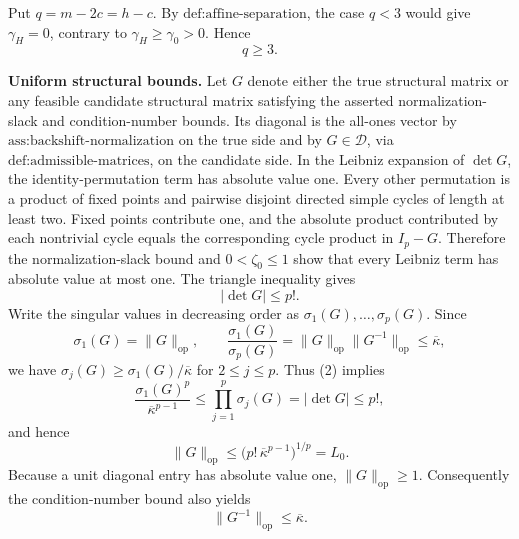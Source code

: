 Put \(q=m-2c=h-c\). By \(\text{def:affine-separation}\), the case \(q<3\) would give \(\gamma_H=0\), contrary to \(\gamma_H\geq\gamma_0>0\). Hence
\[
q\geq3.
\tag{1}
\]

\textbf{Uniform structural bounds.}
Let \(G\) denote either the true structural matrix or any feasible candidate structural matrix satisfying the asserted normalization-slack and condition-number bounds. Its diagonal is the all-ones vector by \(\text{ass:backshift-normalization}\) on the true side and by \(G\in\mathcal D\), via \(\text{def:admissible-matrices}\), on the candidate side. In the Leibniz expansion of \(\det G\), the identity-permutation term has absolute value one. Every other permutation is a product of fixed points and pairwise disjoint directed simple cycles of length at least two. Fixed points contribute one, and the absolute product contributed by each nontrivial cycle equals the corresponding cycle product in \(I_p-G\). Therefore the normalization-slack bound and \(0<\zeta_0\leq1\) show that every Leibniz term has absolute value at most one. The triangle inequality gives
\[
|\det G|\leq p!.
\tag{2}
\]
Write the singular values in decreasing order as \(\sigma_1(G),\ldots,\sigma_p(G)\). Since
\[
\sigma_1(G)=\|G\|_{\mathrm{op}},
\qquad
\frac{\sigma_1(G)}{\sigma_p(G)}
=\|G\|_{\mathrm{op}}\|G^{-1}\|_{\mathrm{op}}
\leq\overline\kappa,
\]
we have \(\sigma_j(G)\geq\sigma_1(G)/\overline\kappa\) for \(2\leq j\leq p\). Thus (2) implies
\[
\frac{\sigma_1(G)^p}{\overline\kappa^{p-1}}
\leq\prod_{j=1}^p\sigma_j(G)
=|\det G|
\leq p!,
\]
and hence
\[
\|G\|_{\mathrm{op}}
\leq\bigl(p!\,\overline\kappa^{p-1}\bigr)^{1/p}
=L_0.
\tag{3}
\]
Because a unit diagonal entry has absolute value one, \(\|G\|_{\mathrm{op}}\geq1\). Consequently the condition-number bound also yields
\[
\|G^{-1}\|_{\mathrm{op}}
\leq\overline\kappa.
\tag{4}
\]

